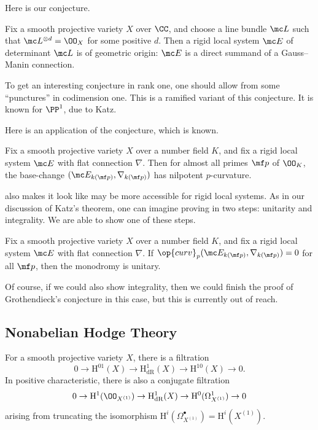 \documentclass[../notes.tex]{subfiles}
\begin{document}
Here is our conjecture.
\begin{conj}[Simpson] \label{conj:simpson}
	Fix a smooth projective variety $X$ over $\CC$, and choose a line bundle $\mc L$ such that $\mc L^{\otimes d}=\OO_X$ for some positive $d$. Then a rigid local system $\mc E$ of determinant $\mc L$ is of geometric origin: $\mc E$ is a direct summand of a Gauss--Manin connection.
\end{conj}
\begin{remark}[Etingof]
	To get an interesting conjecture in rank one, one should allow from some ``punctures'' in codimension one. This is a ramified variant of this conjecture. It is known for $\PP^1$, due to Katz.
\end{remark}
Here is an application of the conjecture, which is known.
\begin{theorem} \label{thm:rigid-to-nilp}
	Fix a smooth projective variety $X$ over a number field $K$, and fix a rigid local system $\mc E$ with flat connection $\nabla$. Then for almost all primes $\mf p$ of $\OO_K$, the base-change $(\mc E_{k(\mf p)},\nabla_{k(\mf p)})$ has nilpotent $p$-curvature.
\end{theorem}
 also makes it look like  may be more accessible for rigid local systems. As in our discussion of Katz's theorem, one can imagine proving  in two steps: unitarity and integrality. We are able to show one of these steps.
\begin{theorem} \label{thm:rigid-to-unitary}
	Fix a smooth projective variety $X$ over a number field $K$, and fix a rigid local system $\mc E$ with flat connection $\nabla$. If $\op{curv}_p(\mc E_{k(\mf p)},\nabla_{k(\mf p)})=0$ for all $\mf p$, then the monodromy is unitary.
\end{theorem}
Of course, if we could also show integrality, then we could finish the proof of Grothendieck's conjecture in this case, but this is currently out of reach.

\subsection{Nonabelian Hodge Theory}
For a smooth projective variety $X$, there is a filtration
\[0\to\mathrm H^{01}(X)\to\mathrm H^1_{\mathrm{dR}}(X)\to\mathrm H^{10}(X)\to0.\]
In positive characteristic, there is also a conjugate filtration
\[0\to\mathrm H^1(\OO_{X^{(1)}})\to\mathrm H^1_{\mathrm{dR}}(X)\to\mathrm H^0(\Omega^1_{X^{(1)}})\to0\]
arising from truncating the isomorphism $\mathrm H^i(\Omega^\bullet_{X^{(1)}})=\mathrm H^i(X^{(1)})$.
\end{document}
